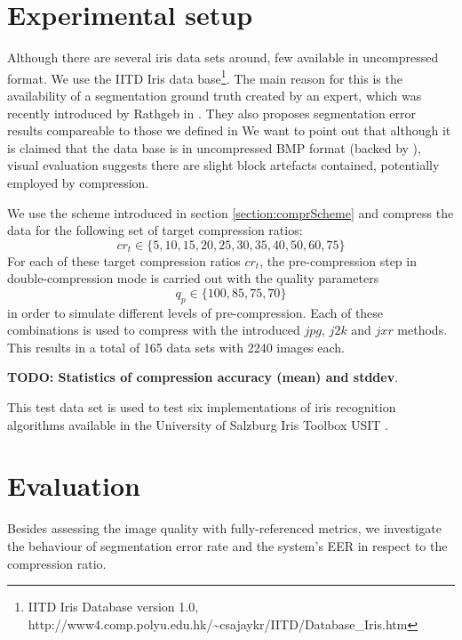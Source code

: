 \documentclass[10pt,twocolumn,letterpaper]{article}
\begin{document}
\section{Experimental setup}
Although there are several iris data sets around, few available in uncompressed format. We use the IITD Iris data base\footnote{IITD Iris Database version 1.0, http://www4.comp.polyu.edu.hk/\textasciitilde csajaykr/IITD/Database\_Iris.htm}. The main reason for this is the availability of a segmentation ground truth created by an expert, which was recently introduced by Rathgeb \etal in \cite{severeCompression}. They also proposes segmentation error results compareable to those we defined in %
We want to point out that although it is claimed that the data base is in uncompressed BMP format (backed by \cite{severeCompression}), visual evaluation suggests there are slight block artefacts contained, potentially employed by compression. %

We use the scheme introduced in section \ref{section:comprScheme} and compress the data for the following set of target compression ratios:
\begin{equation}
cr_t \in \{5,10,15,20,25,30,35,40,50,60,75\}
\end{equation}
For each of these target compression ratios $cr_t$, the pre-compression step in double-compression mode is carried out with the quality parameters
\begin{equation}
q_p \in \{100, 85, 75, 70\}
\end{equation} 
in order to simulate different levels of pre-compression. Each of these combinations is used to compress with the introduced $jpg$, $j2k$ and $jxr$ methods. This results in a total of 165 data sets with 2240 images each.

\textbf{TODO: Statistics of compression accuracy (mean) and stddev}.

This test data set is used to test six implementations of iris recognition algorithms available in the University of Salzburg Iris Toolbox USIT \cite{rathgeb}.



\section{Evaluation}
 Besides assessing the image quality with fully-referenced metrics, we investigate the behaviour of segmentation error rate and the system's EER in respect to the compression ratio.
\end{document}
